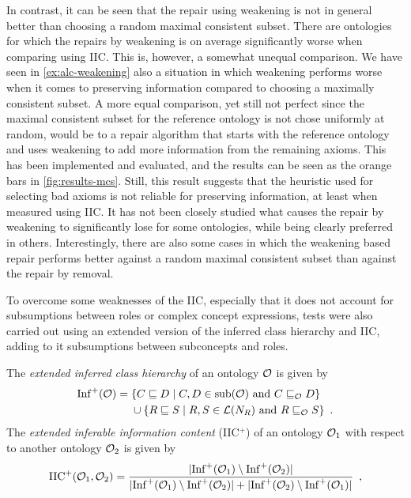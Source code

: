 In contrast, it can be seen that the repair using weakening is not in general better than choosing a random maximal consistent subset. There are ontologies for which the repairs by weakening is on average significantly worse when comparing using IIC. This is, however, a somewhat unequal comparison. We have seen in \cref{ex:alc-weakening} also a situation in which weakening performs worse when it comes to preserving information compared to choosing a maximally consistent subset. A more equal comparison, yet still not perfect since the maximal consistent subset for the reference ontology is not chose uniformly at random, would be to a repair algorithm that starts with the reference ontology and uses weakening to add more information from the remaining axioms. This has been implemented and evaluated, and the results can be seen as the orange bars in \cref{fig:results-mcs}. Still, this result suggests that the heuristic used for selecting bad axioms is not reliable for preserving information, at least when measured using IIC. It has not been closely studied what causes the repair by weakening to significantly lose for some ontologies, while being clearly preferred in others. Interestingly, there are also some cases in which the weakening based repair performs better against a random maximal consistent subset than against the repair by removal.

To overcome some weaknesses of the IIC, especially that it does not account for subsumptions between roles or complex concept expressions, tests were also carried out using an extended version of the inferred class hierarchy and IIC, adding to it subsumptions between subconcepts and roles.

\begin{definition}
  The \emph{extended inferred class hierarchy} of an ontology $\mathcal{O}$ is given by
  \begin{align*}
    {\ensuremath{\operatorname{Inf}}}^+(\mathcal{O}) ={} & \{ C \sqsubseteq D \mid C, D \in {\ensuremath{\operatorname{sub}}}(\mathcal{O}) \text{ and } C \sqsubseteq_\mathcal{O} D \} \\
    & \cup \{ R \sqsubseteq S \mid R, S \in \mathcal{L}(N_R) \text{ and } R \sqsubseteq_\mathcal{O} S \} \enspace.
  \end{align*}
  The \emph{extended inferable information content} (IIC$^+$) of an ontology $\mathcal{O}_1$ with respect to another ontology $\mathcal{O}_2$ is given by
  \begin{align*}
    {\ensuremath{\operatorname{IIC}}}^+(\mathcal{O}_1, \mathcal{O}_2) = \frac{| {\operatorname{Inf}}^+(\mathcal{O}_1) \setminus {\ensuremath{\operatorname{Inf}}}^+(\mathcal{O}_2) |}{|{\operatorname{Inf}}^+(\mathcal{O}_1) \setminus {\ensuremath{\operatorname{Inf}}}^+(\mathcal{O}_2)| + |{\operatorname{Inf}}^+(\mathcal{O}_2) \setminus {\ensuremath{\operatorname{Inf}}}^+(\mathcal{O}_1)|} \enspace,
  \end{align*}
\end{definition}

